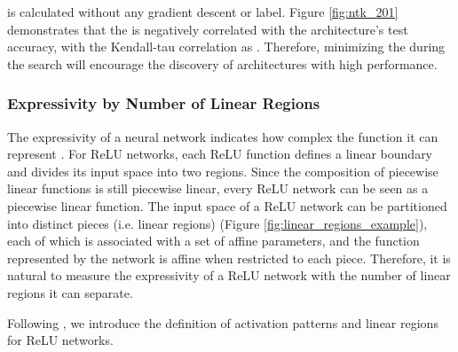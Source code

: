 \documentclass{article} \usepackage{iclr2021_conference,times}
\begin{document}
 is calculated without any gradient descent or label.
Figure \ref{fig:ntk_201} demonstrates that the  is negatively correlated with the architecture's test accuracy, with the Kendall-tau correlation as . Therefore, minimizing the  during the search will encourage the discovery of architectures with high performance.\vspace{-0.5em}

\subsubsection{Expressivity by Number of Linear Regions}\vspace{-0.5em}


The expressivity of a neural network indicates how complex the function it can represent \citep{hornik1989multilayer,giryes2016deep}.
For ReLU networks, each ReLU function defines a linear boundary and divides its input space into two regions. Since the composition of piecewise linear functions is still piecewise linear, every ReLU network can be seen as a piecewise linear function. The input space of a ReLU network can be partitioned into distinct pieces (i.e. linear regions) (Figure \ref{fig:linear_regions_example}), each of which is associated with a set of affine parameters, and the function represented by the network is affine when restricted to each piece. Therefore, it is natural to measure the expressivity of a ReLU network with the number of linear regions it can separate.

Following \citet{raghu2017expressive,serra2018bounding,hanin2019complexity,hanin2019deep,xiong2020number}, we introduce the definition of activation patterns and linear regions for ReLU networks.
\end{document}
